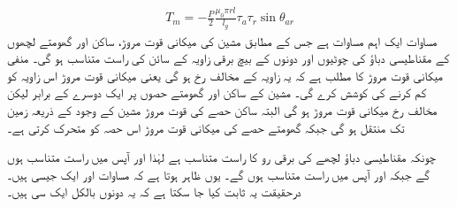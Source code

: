 \begin{align}\label{مساوات_گھومتے_مشین_مروڑ_بذریعہ_کوتوانائی_الف}
T_m=-\frac{P}{2}\frac{\mu_0 \pi r l}{l_g} \tau_a \tau_r \sin \theta_{ar}
\end{align}
مساوات  ایک اہم مساوات ہے جس کے مطابق مشین کی میکانی قوت مروڑ، ساکن اور گھومتے لچھوں کے مقناطیسی دباؤ کی چوٹیوں اور  دونوں کے بیچ برقی زاویہ  کے سائن کی  راست متناسب ہو گی۔ منفی میکانی قوت مروڑ کا مطلب ہے کہ یہ زاویہ   کے مخالف رخ ہو گی یعنی میکانی قوت مروڑ اس زاویہ کو کم کرنے کی کوشش کرے گی۔ مشین کے ساکن اور گھومتے حصوں پر ایک دوسرے کے  برابر لیکن مخالف رخ  میکانی قوت مروڑ ہو گی البتہ ساکن حصے کی قوت مروڑ مشین کے وجود کے ذریعہ زمین تک منتقل ہو گی جبکہ گھومتے حصے کی میکانی قوت مروڑ اس حصہ کو متحرک  کرتی  ہے۔

چونکہ مقناطیسی دباؤ لچھے کی   برقی رو کا راست متناسب ہے لہٰذا   اور  آپس میں  راست متناسب ہوں گے  جبکہ  اور  آپس میں  راست متناسب ہوں گے۔ یوں ظاہر ہوتا ہے کہ مساوات   اور   ایک جیسی ہیں۔ درحقیقت یہ ثابت کیا جا سکتا ہے کہ یہ دونوں بالکل ایک سی ہیں۔

